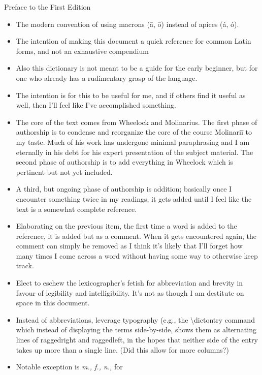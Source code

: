 Preface to the First Edition

\begin{itemize}
  \item The modern convention of using macrons (\=a, \=o)
    instead of apices (\'a, \'o).
  \item The intention of making this document a quick reference
    for common Latin forms, and not an exhaustive compendium
  \item Also this dictionary is not meant to be a guide for the
    early beginner, but for one who already has a rudimentary
    grasp of the language.
  \item The intention is for this to be useful for me, and if others
    find it useful as well, then I'll feel like I've accomplished
    something.
  \item The core of the text comes from Wheelock and Molinarius.
    The first phase of authorship is to condense and reorganize
    the core of the course Molinari\=i to my taste.  Much of his
    work has undergone minimal paraphrasing and I am eternally in
    his debt for his expert presentation of the subject material.
    The second phase of authorship is to add everything in 
    Wheelock which is pertinent but not yet included.
  \item A third, but ongoing phase of authorship is addition;
    basically once I encounter something twice in my readings,
    it gets added until I feel like the text is a somewhat
    complete reference.
  \item Elaborating on the previous item, the first time a word
    is added to the reference, it is added but as a comment.  When
    it gets encountered again, the comment can simply be removed
    as I think it's likely that I'll forget how many times I come
    across a word without having some way to otherwise keep track.
  \item Elect to eschew the lexicographer's fetish for abbreviation
    and brevity in favour of legibility and intelligibility.  It's
    not as though I am destitute on space in this document.
  \item Instead of abbreviations, leverage typography (e.g., the
    \textbackslash dictontry command which instead of displaying the terms
    side-by-side, shows them as alternating lines of raggedright
    and raggedleft, in the hopes that neither side of the entry
    takes up more than a single line.  (Did this allow for more
    columns?)
  \item Notable exception is \textit{m., f., n.,} for \textit{%
}
\end{itemize}
